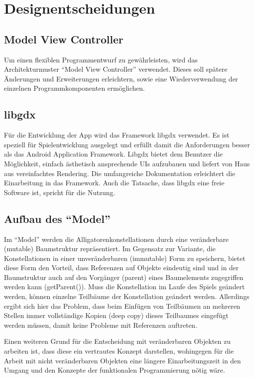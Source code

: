 \chapter{Designentscheidungen}

\section{Model View Controller}
Um einen flexiblen Programmentwurf zu gewährleisten, wird das Architekturmuster "`Model View Controller"' verwendet.
Dieses soll spätere Änderungen und Erweiterungen erleichtern, sowie eine Wiederverwendung der einzelnen Programmkomponenten ermöglichen.

\section{libgdx}
Für die Entwicklung der App wird das Framework libgdx verwendet.
Es ist speziell für Spielentwicklung ausgelegt und erfüllt damit die Anforderungen besser als das Android Application Framework.
 Libgdx bietet dem Benutzer die Möglichkeit, einfach ästhetisch ansprechende UIs aufzubauen und liefert von Haus aus vereinfachtes Rendering.
Die umfangreiche Dokumentation erleichtert die Einarbeitung in das Framework.
Auch die Tatsache, dass libgdx eine freie Software ist, spricht für die Nutzung.

\section{Aufbau des "`Model"'}
Im "`Model"' werden die Alligatorenkonstellationen durch eine veränderbare (mutable) Baumstruktur repräsentiert.
 Im Gegensatz zur Variante, die Konstellationen in einer unveränderbaren (immutable) Form zu speichern, bietet diese Form den Vorteil, dass Referenzen auf Objekte eindeutig sind und in der Baumstruktur auch auf den Vorgänger (parent) eines Baumelements zugegriffen werden kann (getParent()).
Muss die Konstellation im Laufe des Spiels geändert werden, können einzelne Teilbäume der Konstellation geändert werden.
Allerdings ergibt sich hier das Problem, dass beim Einfügen von Teilbäumen an mehreren Stellen immer vollständige Kopien (deep copy) dieses Teilbaumes eingefügt werden müssen, damit keine Probleme mit Referenzen auftreten.

Einen weiteren Grund für die Entscheidung mit veränderbaren Objekten zu arbeiten ist, dass diese ein vertrautes Konzept darstellen, wohingegen für die Arbeit mit nicht veränderbaren Objekten eine längere Einarbeitungszeit in den Umgang und den Konzepte der funktionalen Programmierung nötig wäre.

